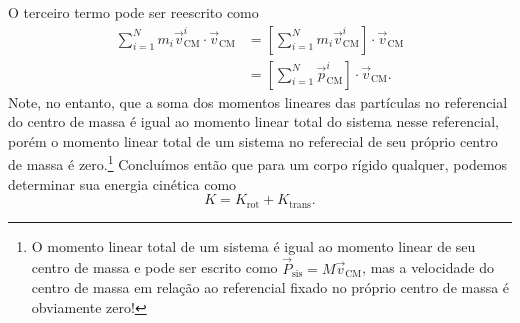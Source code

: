 O terceiro termo pode ser reescrito como
\begin{align}
    \sum_{i=1}^N m_i \vec{v}^i_{\text{CM}} \cdot \vec{v}_{\text{CM}} &= \left[\sum_{i=1}^N m_i \vec{v}^i_{\text{CM}}\right] \cdot \vec{v}_{\text{CM}} \\
    &= \left[\sum_{i = 1}^N \vec{p}^i_{\text{CM}}\right]\cdot \vec{v}_{\text{CM}}.
\end{align}
%
Note, no entanto, que a soma dos momentos lineares das partículas no referencial do centro de massa é igual ao momento linear total do sistema nesse referencial, porém o momento linear total de um sistema no referecial de seu próprio centro de massa é zero.\footnote{O momento linear total de um sistema é igual ao momento linear de seu centro de massa e pode ser escrito como $\vec{P}_{\text{sis}} = M\vec{v}_{\text{CM}}$, mas a velocidade do centro de massa em relação ao referencial fixado no próprio centro de massa é obviamente zero!} Concluímos então que para um corpo rígido qualquer, podemos determinar sua energia cinética como
\begin{equation}
    K = K_{\text{rot}} + K_{\text{trans}}.
\end{equation}

